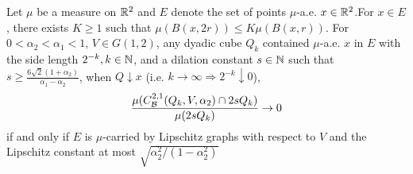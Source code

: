 \begin{lemma}\label{lemma:limQ-2sQ-0}
    Let $\mu$ be a measure on $\mathbb{R}^2$ and $E$ denote the set of points $\mu$-a.e. $x\in\mathbb{R}^2$.For $x\in E$, there exists $K\geq 1$ such that $\mu(B(x, 2r))\leq K\mu(B(x,r))$. For $0<\alpha_2<\alpha_1<1$, $V\in G(1,2)$, any dyadic cube $Q_k$ contained $\mu$-a.e. $x$ in $E$ with the side length $2^{-k}, k\in\mathbb{N}$, and a dilation constant $s\in\mathbb{N}$ such that $s \geq \frac{6\sqrt{2}(1+\alpha_2)}{\alpha_1-\alpha_2}$, when $Q\downarrow x$ (i.e. $k\rightarrow\infty \Rightarrow 2^{-k}\downarrow 0$),
    {\color{red}
    \begin{equation}\label{eq:limBC-2sQ-0}
        \frac{\mu(C_\mathcal B^{2,1}(Q_k, V, \alpha_2)\cap 2sQ_k)}{\mu(2sQ_k)} \rightarrow 0
    \end{equation}
    }
    if and only if $E$ is $\mu$-carried by Lipschitz graphs {\color{red}with respect to $V$ and the Lipschitz constant at most $\sqrt{\alpha_2^2/(1-\alpha_2^2)}$}
\end{lemma}
